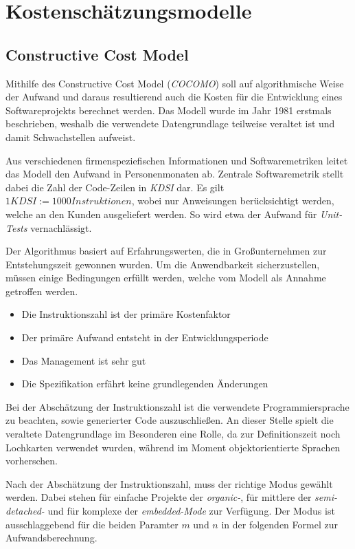 \section{Kostenschätzungsmodelle}

\subsection{Constructive Cost Model}
Mithilfe des Constructive Cost Model (\textit{COCOMO}) soll auf algorithmische Weise der Aufwand und daraus resultierend auch die Kosten für die Entwicklung eines Softwareprojekts berechnet werden. Das Modell wurde im Jahr 1981 erstmals beschrieben, weshalb die verwendete Datengrundlage teilweise veraltet ist und damit Schwachstellen aufweist.

Aus verschiedenen firmenspeziefischen Informationen und Softwaremetriken leitet das Modell den Aufwand in Personenmonaten ab. Zentrale Softwaremetrik stellt dabei die Zahl der Code-Zeilen in \textit{KDSI} dar. Es gilt $1 KDSI := 1000 Instruktionen$, wobei nur Anweisungen berücksichtigt werden, welche an den Kunden ausgeliefert werden. So wird etwa der Aufwand für \textit{Unit-Tests} vernachlässigt.

Der Algorithmus basiert auf Erfahrungswerten, die in Großunternehmen zur Entstehungszeit gewonnen wurden. Um die Anwendbarkeit sicherzustellen, müssen einige Bedingungen erfüllt werden, welche vom Modell als Annahme getroffen werden.

\begin{itemize}
    \item Die Instruktionszahl ist der primäre Kostenfaktor
    \item Der primäre Aufwand entsteht in der Entwicklungsperiode
    \item Das Management ist sehr gut
    \item Die Spezifikation erfährt keine grundlegenden Änderungen
\end{itemize}

Bei der Abschätzung der Instruktionszahl ist die verwendete Programmiersprache zu beachten, sowie generierter Code auszuschließen. An dieser Stelle spielt die veraltete Datengrundlage im Besonderen eine Rolle, da zur Definitionszeit noch Lochkarten verwendet wurden, während im Moment objektorientierte Sprachen vorherschen.

Nach der Abschätzung der Instruktionszahl, muss der richtige Modus gewählt werden. Dabei stehen für einfache Projekte der \textit{organic-}, für mittlere der \textit{semi-detached-} und für komplexe der \textit{embedded-Mode} zur Verfügung. Der Modus ist ausschlaggebend für die beiden Paramter $m$ und $n$ in der folgenden Formel zur Aufwandsberechnung.

